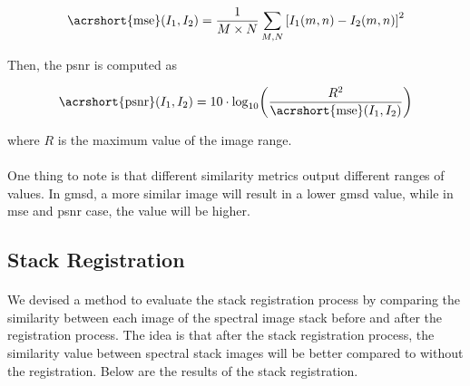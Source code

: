 \documentclass[12pt,oneside]{report}
\begin{document}
\begin{equation}
    \text{\acrshort{mse}}(I_1, I_2) =
    \frac{1}{M \times N}
    \sum_{M,N} {[I_1(m,n) - I_2(m,n)]}^2
\end{equation}

Then, the \acrshort{psnr} is computed as

\begin{equation}
    \text{\acrshort{psnr}}(I_1, I_2) =
    10 \cdot \log_{10}
    \biggl( \frac{R^2}{\text{\acrshort{mse}}(I_1, I_2)} \biggl)
\end{equation}

where $R$ is the maximum value of the image range.

\paragraph{}
One thing to note is that different similarity metrics output different ranges of values. In \acrshort{gmsd}, a more similar image will result in a lower \acrshort{gmsd} value, while in \acrshort{mse} and \acrshort{psnr} case, the value will be higher.

\subsection{Stack Registration}
\paragraph{}
We devised a method to evaluate the stack registration process by comparing the similarity between each image of the spectral image stack before and after the registration process. The idea is that after the stack registration process, the similarity value between spectral stack images will be better compared to without the registration. Below are the results of the stack registration.
\end{document}

